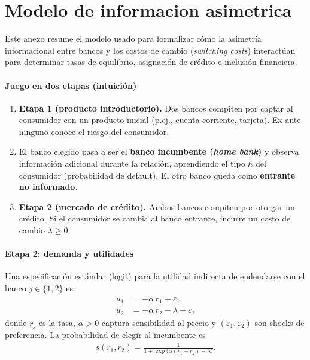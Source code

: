 \documentclass[11pt]{article}
\theoremstyle{plain}
\theoremstyle{plain}
\begin{document}
    \section*{Modelo de informacion asimetrica}
    {\small

    Este anexo resume el modelo  usado para formalizar cómo la asimetría informacional entre bancos y los costos de cambio (\textit{switching costs}) interactúan para determinar tasas de equilibrio, asignación de crédito e inclusión financiera.

    \paragraph{Juego en dos etapas (intuición)}
    \begin{enumerate}
        \item \textbf{Etapa 1 (producto introductorio).} Dos bancos compiten por captar al consumidor con un producto inicial (p.ej., cuenta corriente, tarjeta). Ex ante ninguno conoce el riesgo del consumidor.
        \item El banco elegido pasa a ser el \textbf{banco incumbente (\textit{home bank})} y observa información adicional durante la relación, aprendiendo el tipo $h$ del consumidor (probabilidad de default). El otro banco queda como \textbf{entrante no informado}.
        \item \textbf{Etapa 2 (mercado de crédito).} Ambos bancos compiten por otorgar un crédito. Si el consumidor se cambia al banco entrante, incurre un costo de cambio $\lambda\ge 0$.
    \end{enumerate}

    \paragraph{Etapa 2: demanda y utilidades}
    Una especificación estándar (logit) para la utilidad indirecta de endeudarse con el banco $j\in\{1,2\}$ es:
    \begin{align*}
        u_{1} &= -\alpha\, r_{1} + \varepsilon_{1}\\
        u_{2} &= -\alpha\, r_{2} - \lambda + \varepsilon_{2}
    \end{align*}
    donde $r_j$ es la tasa, $\alpha>0$ captura sensibilidad al precio y $(\varepsilon_1,\varepsilon_2)$ son shocks de preferencia. La probabilidad de elegir al incumbente es
    \begin{align*}
        s(r_1,r_2) = \frac{1}{1+\exp\!\big(\alpha(r_1-r_2)-\lambda\big)}.
    \end{align*}

}
\end{document}
